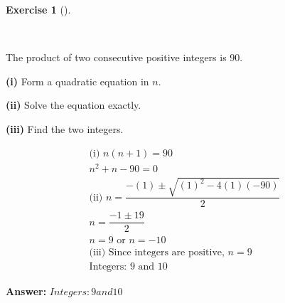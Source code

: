 \documentclass[
  letterpaper,
  DIV=11,
  numbers=noendperiod]{scrreprt}
\theoremstyle{definition}
\newtheorem{exercise}{Exercise}[chapter]
\theoremstyle{remark}
\begin{document}
\begin{exercise}[]\protect\hypertarget{exr-u6-19-2}{}\label{exr-u6-19-2}

~

The product of two consecutive positive integers is 90.

\textbf{(i)} Form a quadratic equation in \(n\).

\textbf{(ii)} Solve the equation exactly.

\textbf{(iii)} Find the two integers.

\begin{tcolorbox}[enhanced jigsaw, opacitybacktitle=0.6, coltitle=black, arc=.35mm, colframe=quarto-callout-tip-color-frame, colback=white, bottomrule=.15mm, left=2mm, colbacktitle=quarto-callout-tip-color!10!white, titlerule=0mm, opacityback=0, title=\textcolor{quarto-callout-tip-color}{\faLightbulb}\hspace{0.5em}{🔍 View Solution}, leftrule=.75mm, breakable, rightrule=.15mm, bottomtitle=1mm, toptitle=1mm, toprule=.15mm]

\begin{align*}
\text{(i) } n(n+1) = 90 \\ n^2 + n - 90 = 0 \\ \text{(ii) } n = \dfrac{-(1) \pm \sqrt{(1)^2 - 4(1)(-90)}}{2} \\ n = \dfrac{-1 \pm 19}{2} \\ n = 9 \text{ or } n = -10 \\ \text{(iii) Since integers are positive, } n = 9 \\ \text{Integers: } 9 \text{ and } 10
\end{align*}

\textbf{Answer:} \(Integers: 9 and 10\)

\end{tcolorbox}

\end{exercise}
\end{document}

